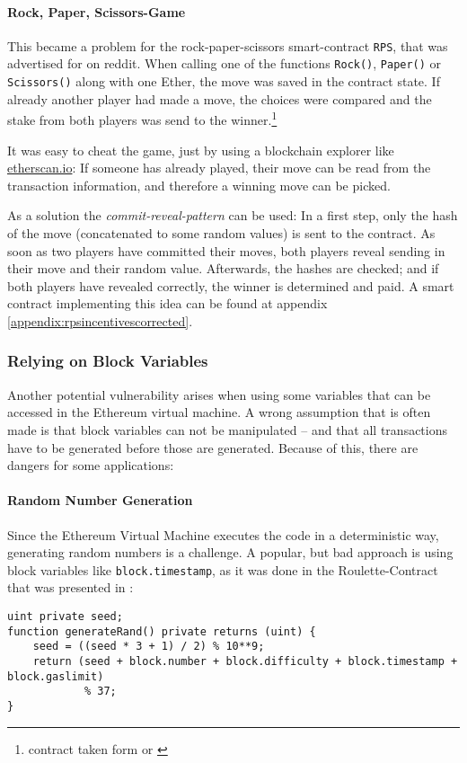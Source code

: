 \paragraph{Rock, Paper, Scissors-Game}
\label{section:vulnerability:miners:rockpaperscissor}
This became a problem for the rock-paper-scissors smart-contract \texttt{RPS}, that was advertised for on reddit. When calling one of the functions \texttt{Rock()}, \texttt{Paper()} or \texttt{Scissors()} along with one Ether, the move was saved in the contract state. If already another player had made a move, the choices were compared and the stake from both players was send to the winner.\footnote{contract taken form \cite{reddit:rockpaperscissor} or \cite{etherscan:rockpaperscissor}}

It was easy to cheat the game, just by using a blockchain explorer like \url{etherscan.io}: If someone has already played, their move can be read from the transaction information, and therefore a winning move can be picked.

As a solution the \textit{commit-reveal-pattern} can be used: In a first step, only the hash of the move (concatenated to some random values) is sent to the contract. As soon as two players have committed their moves, both players reveal sending in their move and their random value. Afterwards, the hashes are checked; and if both players have revealed correctly, the winner is determined and paid. A smart contract implementing this idea can be found at appendix \ref{appendix:rpsincentivescorrected}.

\subsubsection{Relying on Block Variables}
Another potential vulnerability arises when using some variables that can be accessed in the Ethereum virtual machine. A wrong assumption that is often made is that block variables can not be manipulated -- and that all transactions have to be generated before those are generated. Because of this, there are dangers for some applications:

\paragraph{Random Number Generation}
Since the Ethereum Virtual Machine executes the code in a deterministic way, generating random numbers is a challenge. A popular, but bad approach is using block variables like \texttt{block.timestamp}, as it was done in the Roulette-Contract that was presented in \cite{swende:breakingthehouse}:
\begin{verbatim}
uint private seed;
function generateRand() private returns (uint) { 
    seed = ((seed * 3 + 1) / 2) % 10**9;
    return (seed + block.number + block.difficulty + block.timestamp + block.gaslimit)
            % 37;
}
\end{verbatim}

